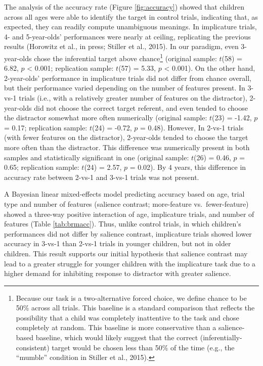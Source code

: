 \documentclass[man]{apa6}
\theoremstyle{definition}
\theoremstyle{definition}
\theoremstyle{definition}
\theoremstyle{remark}
\begin{document}
The analysis of the accuracy rate (Figure \ref{fig:accuracy}) showed
that children across all ages were able to identify the target in
control trials, indicating that, as expected, they can readily compute
unambiguous meanings. In implicature trials, 4- and 5-year-olds'
performances were nearly at ceiling, replicating the previous results
(Horowitz et al., in press; Stiller et al., 2015). In our paradigm, even
3-year-olds chose the inferential target above chance\footnote{Because
  our task is a two-alternative forced choice, we define chance to be
  50\% across all trials. This baseline is a standard comparison that
  reflects the possibility that a child was completely inattentive to
  the task and chose completely at random. This baseline is more
  conservative than a salience-based baseline, which would likely
  suggest that the correct (inferentially-consistent) target would be
  chosen less than 50\% of the time (e.g., the \enquote{mumble}
  condition in Stiller et al., 2015).} (original sample: \(t\)(58) =
6.82, \(p\) \textless{} 0.001; replication sample: \(t\)(57) = 5.33,
\(p\) \textless{} 0.001). On the other hand, 2-year-olds' performance in
implicature trials did not differ from chance overall, but their
performance varied depending on the number of features present. In
3-vs-1 trials (i.e., with a relatively greater number of features on the
distractor), 2-year-olds did not choose the correct target referent, and
even tended to choose the distractor somewhat more often numerically
(original sample: \(t\)(23) = -1.42, \(p\) = 0.17; replication sample:
\(t\)(24) = -0.72, \(p\) = 0.48). However, In 2-vs-1 trials (with fewer
features on the distractor), 2-year-olds tended to choose the target
more often than the distractor. This difference was numerically present
in both samples and statistically significant in one (original sample:
\(t\)(26) = 0.46, \(p\) = 0.65; replication sample: \(t\)(24) = 2.57,
\(p\) = 0.02). By 4 years, this difference in accuracy rate between
2-vs-1 and 3-vs-1 trials was not present.

A Bayesian linear mixed-effects model predicting accuracy based on age,
trial type and number of features (salience contrast; more-feature
vs.~fewer-feature) showed a three-way positive interaction of age,
implicature trials, and number of features (Table \ref{tab:brmacc}).
Thus, unlike control trials, in which children's performances did not
differ by salience contrast, implicature trials showed lower accuracy in
3-vs-1 than 2-vs-1 trials in younger children, but not in older
children. This result supports our initial hypothesis that salience
contrast may lead to a greater struggle for younger children with the
implicature task due to a higher demand for inhibiting response to
distractor with greater salience.
\end{document}
